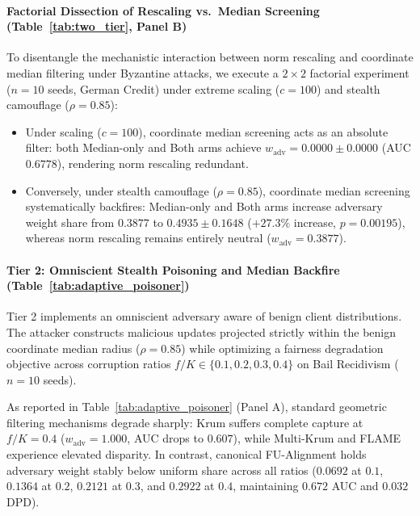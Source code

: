 \paragraph{Factorial Dissection of Rescaling vs.\ Median Screening (Table~\ref{tab:two_tier}, Panel B)}
To disentangle the mechanistic interaction between norm rescaling and coordinate median filtering under Byzantine attacks, we execute a $2 \times 2$ factorial experiment ($n=10$ seeds, German Credit) under extreme scaling ($c=100$) and stealth camouflage ($\rho=0.85$):
\begin{itemize}[leftmargin=*]
    \item Under scaling ($c=100$), coordinate median screening acts as an absolute filter: both Median-only and Both arms achieve $w_{\mathrm{adv}} = 0.0000 \pm 0.0000$ (AUC $0.6778$), rendering norm rescaling redundant.
    \item Conversely, under stealth camouflage ($\rho=0.85$), coordinate median screening systematically backfires: Median-only and Both arms increase adversary weight share from $0.3877$ to $0.4935 \pm 0.1648$ ($+27.3\%$ increase, $p = 0.00195$), whereas norm rescaling remains entirely neutral ($w_{\mathrm{adv}} = 0.3877$).
\end{itemize}



\paragraph{Tier 2: Omniscient Stealth Poisoning and Median Backfire (Table~\ref{tab:adaptive_poisoner})}
Tier 2 implements an omniscient adversary aware of benign client distributions. The attacker constructs malicious updates projected strictly within the benign coordinate median radius ($\rho = 0.85$) while optimizing a fairness degradation objective across corruption ratios $f/K \in \{0.1, 0.2, 0.3, 0.4\}$ on Bail Recidivism ($n=10$ seeds).

As reported in Table~\ref{tab:adaptive_poisoner} (Panel A), standard geometric filtering mechanisms degrade sharply: Krum suffers complete capture at $f/K=0.4$ ($w_{\mathrm{adv}} = 1.000$, AUC drops to $0.607$), while Multi-Krum and FLAME experience elevated disparity. In contrast, canonical FU-Alignment holds adversary weight stably below uniform share across all ratios ($0.0692$ at $0.1$, $0.1364$ at $0.2$, $0.2121$ at $0.3$, and $0.2922$ at $0.4$, maintaining $0.672$ AUC and $0.032$ DPD).

